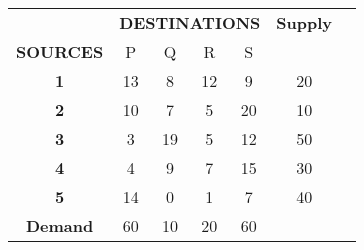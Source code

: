 \begin{table}[H]
    \centering
    \begin{tabular}{|c|c|c|c|c|c|c|}
        \hline
        & \multicolumn{4}{c|}{\textbf{DESTINATIONS}} & \textbf{Supply} \\ \cline{2-5}
        \textbf{SOURCES} & P & Q & R & S & \\ \hline
        \textbf{1} & 13 & 8 & 12 & 9 & 20 \\ \hline
        \textbf{2} & 10 & 7 & 5 & 20 & 10 \\ \hline
        \textbf{3} & 3 & 19 & 5 & 12 & 50 \\ \hline
        \textbf{4} & 4 & 9 & 7 & 15 & 30 \\ \hline
        \textbf{5} & 14 & 0 & 1 & 7 & 40 \\ \hline
        \textbf{Demand} & 60 & 10 & 20 & 60 & \\ \hline
    \end{tabular}
\end{table} 
